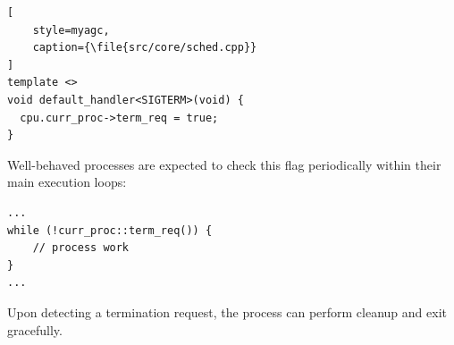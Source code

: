 \begin{lstlisting}[
    style=myagc,
    caption={\file{src/core/sched.cpp}}
]
template <>
void default_handler<SIGTERM>(void) {
  cpu.curr_proc->term_req = true;
}
\end{lstlisting}

Well-behaved processes are expected to check this flag periodically within their main
execution loops:

\begin{lstlisting}[style=myagc]
...
while (!curr_proc::term_req()) {
    // process work
}
...
\end{lstlisting}

Upon detecting a termination request, the process can perform cleanup and exit
gracefully.

